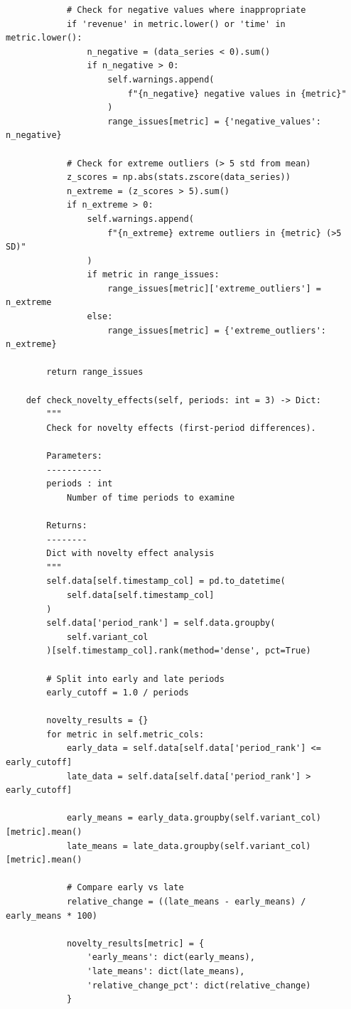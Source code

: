 \begin{lstlisting}
            # Check for negative values where inappropriate
            if 'revenue' in metric.lower() or 'time' in metric.lower():
                n_negative = (data_series < 0).sum()
                if n_negative > 0:
                    self.warnings.append(
                        f"{n_negative} negative values in {metric}"
                    )
                    range_issues[metric] = {'negative_values': n_negative}

            # Check for extreme outliers (> 5 std from mean)
            z_scores = np.abs(stats.zscore(data_series))
            n_extreme = (z_scores > 5).sum()
            if n_extreme > 0:
                self.warnings.append(
                    f"{n_extreme} extreme outliers in {metric} (>5 SD)"
                )
                if metric in range_issues:
                    range_issues[metric]['extreme_outliers'] = n_extreme
                else:
                    range_issues[metric] = {'extreme_outliers': n_extreme}

        return range_issues

    def check_novelty_effects(self, periods: int = 3) -> Dict:
        """
        Check for novelty effects (first-period differences).

        Parameters:
        -----------
        periods : int
            Number of time periods to examine

        Returns:
        --------
        Dict with novelty effect analysis
        """
        self.data[self.timestamp_col] = pd.to_datetime(
            self.data[self.timestamp_col]
        )
        self.data['period_rank'] = self.data.groupby(
            self.variant_col
        )[self.timestamp_col].rank(method='dense', pct=True)

        # Split into early and late periods
        early_cutoff = 1.0 / periods

        novelty_results = {}
        for metric in self.metric_cols:
            early_data = self.data[self.data['period_rank'] <= early_cutoff]
            late_data = self.data[self.data['period_rank'] > early_cutoff]

            early_means = early_data.groupby(self.variant_col)[metric].mean()
            late_means = late_data.groupby(self.variant_col)[metric].mean()

            # Compare early vs late
            relative_change = ((late_means - early_means) / early_means * 100)

            novelty_results[metric] = {
                'early_means': dict(early_means),
                'late_means': dict(late_means),
                'relative_change_pct': dict(relative_change)
            }


\end{lstlisting}
